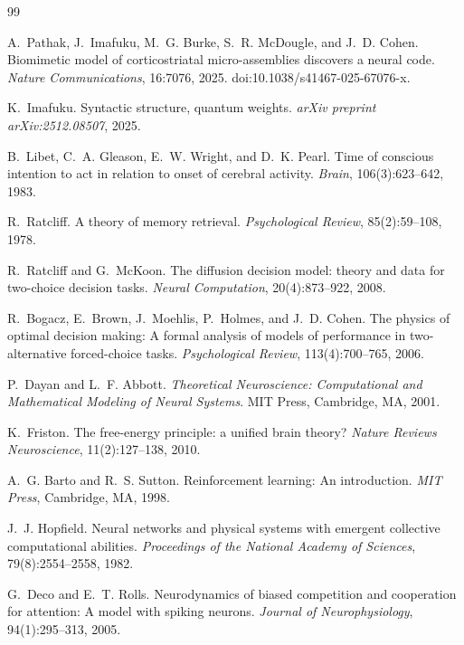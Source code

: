 \documentclass[11pt]{article}
\begin{document}
\begin{thebibliography}{99}

A.~Pathak, J.~Imafuku, M.~G. Burke, S.~R. McDougle, and J.~D. Cohen.
\newblock Biomimetic model of corticostriatal micro-assemblies discovers a neural code.
\newblock \emph{Nature Communications}, 16:7076, 2025.
\newblock doi:10.1038/s41467-025-67076-x.

K.~Imafuku.
\newblock Syntactic structure, quantum weights.
\newblock \emph{arXiv preprint arXiv:2512.08507}, 2025.

B.~Libet, C.~A. Gleason, E.~W. Wright, and D.~K. Pearl.
\newblock Time of conscious intention to act in relation to onset of cerebral activity.
\newblock \emph{Brain}, 106(3):623--642, 1983.

R.~Ratcliff.
\newblock A theory of memory retrieval.
\newblock \emph{Psychological Review}, 85(2):59--108, 1978.

R.~Ratcliff and G.~McKoon.
\newblock The diffusion decision model: theory and data for two-choice decision tasks.
\newblock \emph{Neural Computation}, 20(4):873--922, 2008.

R.~Bogacz, E.~Brown, J.~Moehlis, P.~Holmes, and J.~D. Cohen.
\newblock The physics of optimal decision making: A formal analysis of models of performance in two-alternative forced-choice tasks.
\newblock \emph{Psychological Review}, 113(4):700--765, 2006.

P.~Dayan and L.~F. Abbott.
\newblock \emph{Theoretical Neuroscience: Computational and Mathematical Modeling of Neural Systems}.
\newblock MIT Press, Cambridge, MA, 2001.

K.~Friston.
\newblock The free-energy principle: a unified brain theory?
\newblock \emph{Nature Reviews Neuroscience}, 11(2):127--138, 2010.

A.~G. Barto and R.~S. Sutton.
\newblock Reinforcement learning: An introduction.
\newblock \emph{MIT Press}, Cambridge, MA, 1998.

J.~J. Hopfield.
\newblock Neural networks and physical systems with emergent collective computational abilities.
\newblock \emph{Proceedings of the National Academy of Sciences}, 79(8):2554--2558, 1982.

G.~Deco and E.~T. Rolls.
\newblock Neurodynamics of biased competition and cooperation for attention: A model with spiking neurons.
\newblock \emph{Journal of Neurophysiology}, 94(1):295--313, 2005.


\end{thebibliography}
\end{document}
